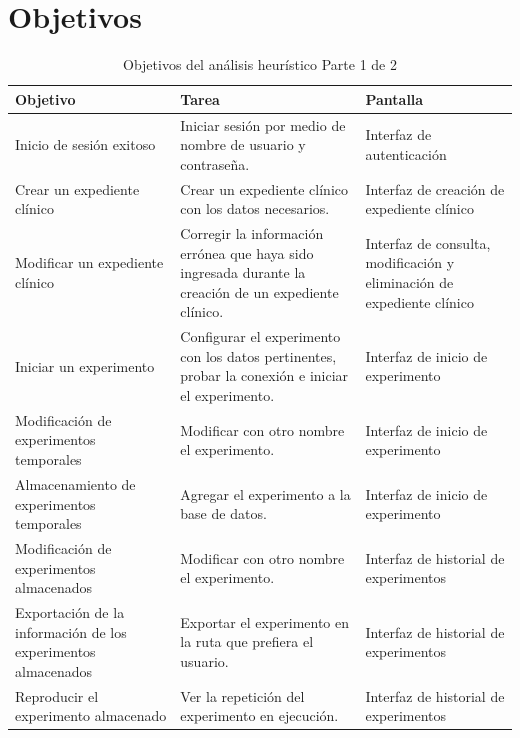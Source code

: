 \newpage

\section{Objetivos}

\begin{table}[H]
\begin{center}
\begin{tabular}{||p{4cm}|p{6cm}|p{4cm}||}
\hline 
\cellcolor{lightgray}\textbf{Objetivo}
 & \cellcolor{lightgray}\textbf{Tarea}
 & \cellcolor{lightgray}\textbf{Pantalla} \\ \hline 

{Inicio de sesión exitoso}&{Iniciar sesión por medio de nombre de usuario y contraseña.}&{Interfaz de autenticación} \\ \hline 
{Crear un expediente clínico}&{Crear un expediente clínico con los datos necesarios.}&{Interfaz de creación de expediente clínico} \\ \hline 
{Modificar un expediente clínico}&{Corregir la información errónea que haya sido ingresada durante la creación de un expediente clínico.}&{Interfaz de consulta, modificación y eliminación de expediente clínico} \\ \hline 
{Iniciar un experimento}&{Configurar el experimento con los datos pertinentes, probar la conexión e iniciar el experimento.}&{Interfaz de inicio de experimento} \\ \hline 
{Modificación de experimentos temporales}&{Modificar con otro nombre el experimento.}&{Interfaz de inicio de experimento} \\ \hline 
{Almacenamiento de experimentos temporales}&{Agregar el experimento a la base de datos.}&{Interfaz de inicio de experimento} \\ \hline 
{Modificación de experimentos almacenados}&{Modificar con otro nombre el experimento.}&{ Interfaz de historial de experimentos} \\ \hline 
{Exportación de la información de los experimentos almacenados}&{Exportar el experimento en la ruta que prefiera el usuario.}&{\item Interfaz de historial de experimentos} \\ \hline 
{Reproducir el experimento almacenado}&{Ver la repetición del experimento en ejecución.}&{ Interfaz de historial de experimentos} \\ \hline 

\end{tabular}

\caption{Objetivos del análisis heurístico Parte 1 de 2}
\label{XX21}
\end{center}
\end{table}
